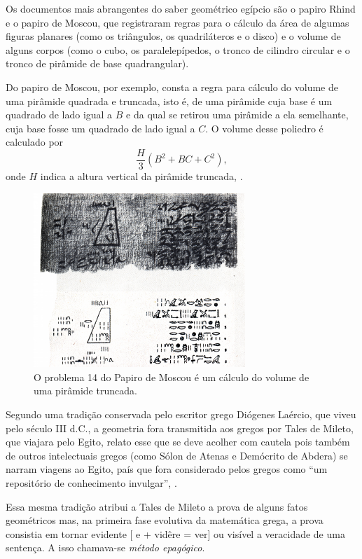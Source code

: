 \documentclass{hipatia}
\begin{document}
Os documentos mais abrangentes do saber geométrico egípcio são o papiro Rhind e o papiro de Moscou, que registraram regras para o cálculo da área de algumas figuras planares (como os triângulos, os quadriláteros e o disco) e o volume de alguns corpos (como o cubo, os paralelepípedos, o tronco de cilindro circular e o tronco de pirâmide de base quadrangular).

Do papiro de Moscou, por exemplo, consta a regra para cálculo do volume de uma pirâmide quadrada e truncada, isto é, de uma pirâmide cuja base é um quadrado de lado igual a $B$ e da qual se retirou uma pirâmide a ela semelhante, cuja base fosse um quadrado de lado igual a $C$. O volume desse poliedro é calculado por $$\frac{H}{3}\left(B^2 + BC + C^2\right),$$ onde $H$ indica a altura vertical da pirâmide truncada, \cite[p. 7]{anglin1995}.

\begin{figure}[htb!]
    \includegraphics[width=8cm]{problema14.jpg}
 \caption*{O problema 14 do Papiro de Moscou é um cálculo do volume de uma pirâmide truncada.}   
\end{figure}

Segundo uma tradição conservada pelo escritor grego Diógenes Laércio, que viveu pelo século III d.C., a geometria fora transmitida aos gregos por Tales de Mileto, que viajara pelo Egito, relato esse que se deve acolher com cautela pois também de outros intelectuais gregos (como Sólon de Atenas e Demócrito de Abdera) se narram viagens ao Egito, país que fora considerado pelos gregos como ``um repositório de conhecimento invulgar'', \cite[p. 11]{momigliano1991}.

Essa mesma tradição atribui a Tales de Mileto a prova de alguns fatos geométricos mas, na primeira fase evolutiva da matemática grega, a prova consistia em tornar evidente  [ e + vidêre = ver]  ou visível a veracidade de uma sentença. A isso chamava-se \emph{método epagógico}. \cite[p. 127--128]{otte2006}
\end{document}
